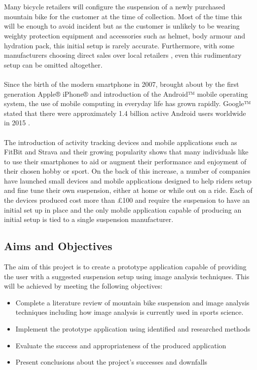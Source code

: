 	\\\\
	Many bicycle retailers will configure the suspension of a newly purchased mountain bike for the customer at the time of collection. Most of the time this will be enough to avoid incident but as the customer is unlikely to be wearing weighty protection equipment and accessories such as helmet, body armour and hydration pack, this initial setup is rarely accurate. Furthermore, with some manufacturers choosing direct sales over
	local retailers \citep{roseonline,ytonline}, even this rudimentary setup can be omitted altogether.
	\\\\
	Since the birth of the modern smartphone in 2007, brought about by the first generation Apple® iPhone® and introduction of the Android™ mobile operating system, the use of mobile computing in everyday life has grown rapidly. Google™ stated that there were approximately 1.4 billion active Android users worldwide in 2015 \citep{androidusers}.
	\\\\
	The introduction of activity tracking devices and mobile applications such as FitBit \citep{fitbit} and Strava \citep{strava} and their growing popularity \citep{apppopularity} shows that many individuals like to  use  their smartphones to aid or augment their performance and enjoyment of their chosen  hobby or sport. On the back of this increase, a number of companies have launched small devices \citep{sussmybike, shockwiztrademark} and mobile applications \citep{foxird} designed to help riders setup and fine tune their own suspension, either at home or while out on a ride. Each of the devices produced cost more than £100 and require the suspension to have an initial set up in place and the only mobile application capable of producing an initial setup is tied to a single suspension manufacturer.
\subsection{Aims and Objectives}\label{sec:aims_and_objectives}
	The aim of this project is to create a prototype application capable of providing the user with a suggested suspension setup using image analysis techniques. This will be achieved by meeting the following objectives:
	\begin{itemize}
		\item Complete a literature review of mountain bike suspension and image analysis techniques including how image analysis is currently used in sports science.
		\item Implement the prototype application using identified and researched methods
		\item Evaluate the success and appropriateness of the produced application
		\item Present conclusions about the project's successes and downfalls
	\end{itemize}
